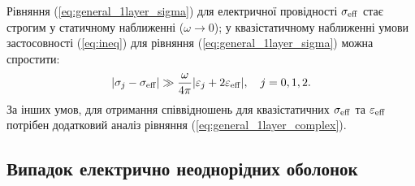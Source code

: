 \documentclass[14pt,twoside]{vakthesis}
\begin{document}
Рівняння (\ref{eq:general_1layer_sigma}) для електричної провідності $\sigma_{\rm eff}$ стає строгим у статичному наближенні ($\omega \to 0$); у квазістатичному наближенні умови застосовності (\ref{eq:ineq}) для рівняння (\ref{eq:general_1layer_sigma}) можна спростити:
\begin{equation}\label{eq:ineq-one}
|\sigma_j - \sigma_{\rm eff}| \gg \frac{\omega}{4\pi} |\varepsilon_j + 2\varepsilon_{\rm eff}|, \quad j=0,1,2.
\end{equation}
За інших умов, для отримання співвідношень для квазістатичних $\sigma_{\rm eff}$ та $\varepsilon_{\rm eff}$ потрібен додатковий аналіз рівняння (\ref{eq:general_1layer_complex}).


\subsection{Випадок електрично неоднорідних оболонок}\label{sec:model-inhomog}
\end{document}
